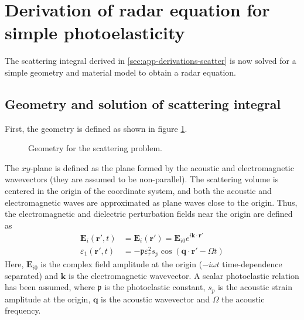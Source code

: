 \documentclass[11pt,twoside]{eitExjobb}
\begin{document}
	\section{Derivation of radar equation for simple photoelasticity \label{sec:app-derivations-radar}}
	The scattering integral derived in \ref{sec:app-derivations-scatter} is now solved for a simple geometry and material model to obtain a radar equation.
	
	\subsection{Geometry and solution of scattering integral}
	First, the geometry is defined as shown in figure \ref{fig:radareq-geom}.
	\begin{figure}[h]
		\centering
		\resizebox{\textwidth}{!}{
			
		}
		\caption{\label{fig:radareq-geom} Geometry for the scattering problem.}
	\end{figure}
	The $xy$-plane is defined as the plane formed by the acoustic and electromagnetic wavevectors (they are assumed to be non-parallel). The scattering volume is centered in the origin of the coordinate system, and both the acoustic and electromagnetic waves are approximated as plane waves close to the origin. Thus, the electromagnetic and dielectric perturbation fields near the origin are defined as
	\begin{align}
		\bm{E}_i (\bm{r}',t) &= \bm{E}_i (\bm{r}') = \bm{E}_{i0} e^{i\bm{k}\cdot\bm{r}'} \label{eq:app-radar-planeE} \\
		\varepsilon_1 (\bm{r}',t) &= -\mathfrak{p} \varepsilon_r^2 s_p \cos(\bm{q} \cdot \bm{r}' - \Omega t) \label{eq:app-radar-planeEps}
	\end{align}
	Here, $\bm{E}_{i0}$ is the complex field amplitude at the origin ($-i\omega t$ time-dependence separated) and $\bm{k}$ is the electromagnetic wavevector. A scalar photoelastic relation has been assumed, where $\mathfrak{p}$ is the photoelastic constant, $s_p$ is the acoustic strain amplitude at the origin, $\bm{q}$ is the acoustic wavevector and $\Omega$ the acoustic frequency.
	
\end{document}
